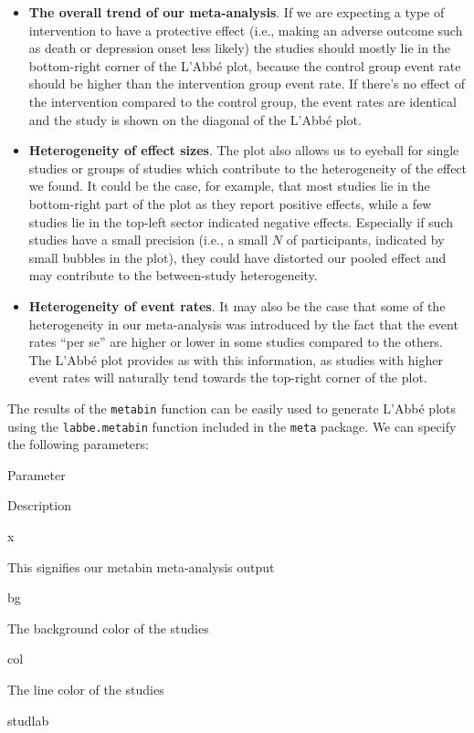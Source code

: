 \documentclass[]{book}
\providecommand{\tightlist}{%
  \setlength{\itemsep}{0pt}\setlength{\parskip}{0pt}}
\begin{document}
\begin{itemize}
\tightlist
\item
  \textbf{The overall trend of our meta-analysis}. If we are expecting a type of intervention to have a protective effect (i.e., making an adverse outcome such as death or depression onset less likely) the studies should mostly lie in the bottom-right corner of the L'Abbé plot, because the control group event rate should be higher than the intervention group event rate. If there's no effect of the intervention compared to the control group, the event rates are identical and the study is shown on the diagonal of the L'Abbé plot.
\item
  \textbf{Heterogeneity of effect sizes}. The plot also allows us to eyeball for single studies or groups of studies which contribute to the heterogeneity of the effect we found. It could be the case, for example, that most studies lie in the bottom-right part of the plot as they report positive effects, while a few studies lie in the top-left sector indicated negative effects. Especially if such studies have a small precision (i.e., a small \(N\) of participants, indicated by small bubbles in the plot), they could have distorted our pooled effect and may contribute to the between-study heterogeneity.
\item
  \textbf{Heterogeneity of event rates}. It may also be the case that some of the heterogeneity in our meta-analysis was introduced by the fact that the event rates ``per se'' are higher or lower in some studies compared to the others. The L'Abbé plot provides as with this information, as studies with higher event rates will naturally tend towards the top-right corner of the plot.
\end{itemize}

The results of the \texttt{metabin} function can be easily used to generate L'Abbé plots using the \texttt{labbe.metabin} function included in the \texttt{meta} package. We can specify the following parameters:

Parameter

Description

x

This signifies our metabin meta-analysis output

bg

The background color of the studies

col

The line color of the studies

studlab
\end{document}
